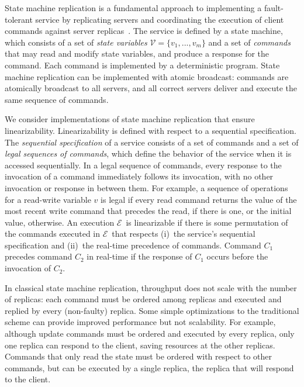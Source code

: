 \documentclass[11pt]{article}
\newcommand{\ex}{$\mathcal{E}$}
\newcommand{\vvm}{\mathcal{V}}
\begin{document}
State machine replication is a fundamental approach to implementing a fault-tolerant service by replicating servers and coordinating the execution of client commands against server replicas~\cite{Lam78, Sch90}.
The service is defined by a state machine, which consists of a set of \emph{state variables} $\vvm = \{v_1, ..., v_m\}$
and a set of \emph{commands} that may read and modify state variables, and produce a response for the command.
Each command is implemented by a deterministic program.
State machine replication can be implemented with atomic broadcast: commands are atomically broadcast to all servers, and all correct servers deliver and execute the same sequence of commands.

We consider implementations of state machine replication that ensure linearizability.
%
Linearizability is defined with respect to a sequential specification.
The \emph{sequential specification} of a service consists of a set of commands and a set of \emph{legal sequences of commands}, which define the behavior of the service when it is accessed sequentially.
In a legal sequence of commands, every response to the invocation of a command immediately follows its invocation, with no other invocation or response in between them.
For example, a sequence of operations for a read-write variable $v$ is legal if every read command returns the value of the most recent write command that precedes the read, if there is one, or the initial value, otherwise.
An execution \ex\ is linearizable if there is some permutation of the commands executed in \ex\ that respects (i)~the service's sequential specification and (ii)~the real-time precedence of commands.
Command $C_1$ precedes command $C_2$ in real-time if the response of $C_1$ occurs before the invocation of $C_2$.

In classical state machine replication, throughput does not scale with the number of replicas: each command must be ordered among replicas and executed and replied by every (non-faulty) replica.
Some simple optimizations to the traditional scheme can provide improved performance but not scalability.
For example, although update commands must be ordered and executed by every replica, only one replica can respond to the client, saving resources at the other replicas.
Commands that only read the state must be ordered with respect to other commands, but can be executed by a single replica, the replica that will respond to the client.
\end{document}
